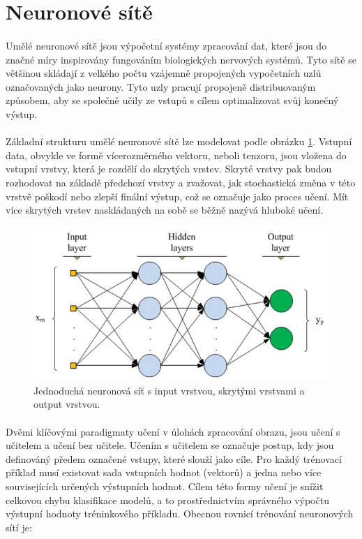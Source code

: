 \section{Neuronové sítě}
\label{neural_networks}
\paragraph{} 
Umělé neuronové sítě jsou výpočetní systémy zpracování dat, které jsou do značné míry inspirovány fungováním biologických nervových systémů. Tyto sítě se většinou skládají z velkého počtu vzájemně propojených vypočetních uzlů označovaných jako neurony. Tyto uzly pracují propojeně distribuovaným způsobem, aby se společně učily ze vstupů s cílem optimalizovat svůj konečný výstup.
\paragraph{}
Základní strukturu umělé neuronové sítě lze modelovat podle obrázku \ref{simple_neural}. Vstupní data, obvykle ve formě vícerozměrného vektoru, neboli tenzoru, jsou vložena do vstupní vrstvy, která je rozdělí do skrytých vrstev. Skryté vrstvy pak budou rozhodovat na základě předchozí vrstvy a zvažovat, jak stochastická změna v této vrstvě poškodí nebo zlepší ﬁnální výstup, což se označuje jako proces učení. Mít více skrytých vrstev naskládaných na sobě se běžně nazývá hluboké učení.

\begin{figure}[h]\centering
    \centering
    \includegraphics[width=0.6\linewidth]{obrazky-figures/simple_neural.png}
    \caption{Jednoduchá neuronová síť s input vrstvou, skrytými vrstvami a output vrstvou\protect\footnotemark{}.}
    \label{simple_neural}
\end{figure}
\paragraph{}
Dvěmi klíčovými paradigmaty učení v úlohách zpracování obrazu, jsou učení s učitelem a učení bez učitele. Učením s učitelem se označuje postup, kdy jsou definováný předem označené vstupy, které slouží jako cíle. Pro každý trénovací příklad musí existovat sada vstupních hodnot (vektorů) a jedna nebo více souvisejících určených výstupních hodnot. Cílem této formy učení je snížit celkovou chybu klasifikace modelů, a to prostřednictvím správného výpočtu výstupní hodnoty tréninkového příkladu. Obecnou rovnicí trénování neuronových sítí je:

